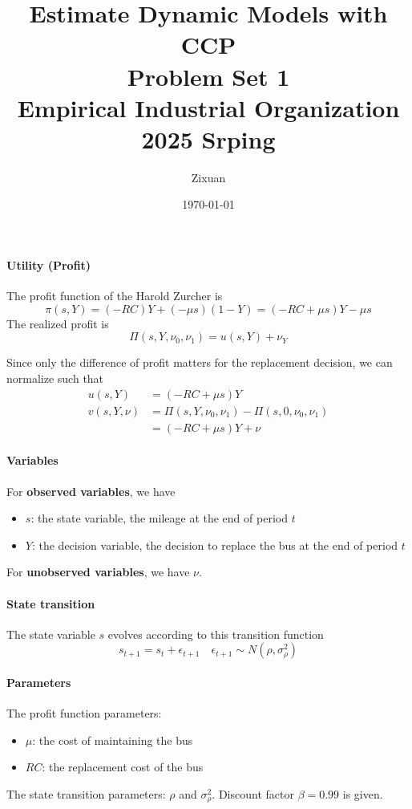 \documentclass[12pt]{article}[margin=1in]
\title{\textbf{Estimate Dynamic Models with CCP} \\
    \vspace{.3cm}
    \large Problem Set 1 \\
    Empirical Industrial Organization 2025 Srping}
\author{Zixuan}
\date{\today}
\begin{document}
\maketitle

\setcounter{page}{1}

\paragraph{Utility (Profit)}
The profit function of the Harold Zurcher is
\begin{equation*}
    \pi(s,Y) = (-RC)Y + (-\mu s)(1 - Y) = (-RC + \mu s)Y - \mu s
\end{equation*}
The realized profit is
\begin{equation*}
    \Pi(s,Y,\nu_0,\nu_1) = u(s,Y) + \nu_Y
\end{equation*}

Since only the difference of profit matters for the replacement decision, we
can normalize such that
\begin{align*}
    u(s,Y)      & = (-RC + \mu s)Y                              \\
    v(s,Y, \nu) & =  \Pi(s,Y,\nu_0,\nu_1) -\Pi(s,0,\nu_0,\nu_1) \\
                & = (-RC + \mu s)Y + \nu
\end{align*}

\paragraph{Variables} For \textbf{observed variables}, we have
\begin{itemize}
    \item $s$: the state variable, the mileage at the end of period $t$
    \item $Y$: the decision variable, the decision to replace the bus at the end of period $t$
\end{itemize}
For \textbf{unobserved variables}, we have $\nu$.
\paragraph{State transition} The state variable $s$ evolves according to this
transition function
\begin{equation*}
    s_{t+1} = s_t + \epsilon_{t+1} \quad \epsilon_{t+1} \sim N(\rho, \sigma_{\rho}^2)
\end{equation*}
\paragraph{Parameters} The profit function parameters:
\begin{itemize}
    \item $\mu$: the cost of maintaining the bus
    \item $RC$: the replacement cost of the bus
\end{itemize}
The state transition parameters: $\rho$ and $\sigma_{\rho}^2$.
Discount factor $\beta=0.99$ is given.
\end{document}
